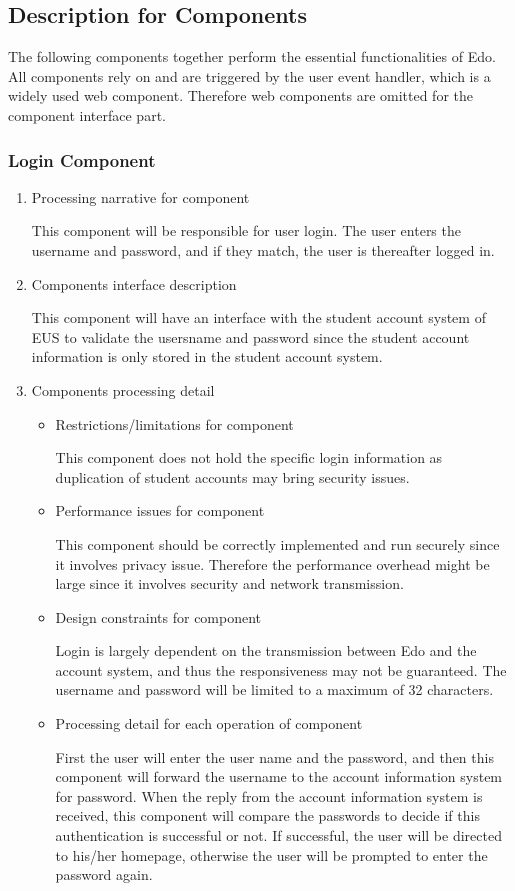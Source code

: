 \documentclass[paper=a4, fontsize=11pt]{scrartcl}
\numberwithin{equation}{section}		%
\numberwithin{figure}{section}			%
\numberwithin{table}{section}				%
\begin{document}
\subsection{Description for Components}

The following components together perform the essential functionalities of Edo. All components rely on and are triggered by the user event handler, which is a widely used web component. Therefore web components are omitted for the component interface part.

\subsubsection{Login Component}
\begin{enumerate}
	\item Processing narrative for component
	\par This component will be responsible for user login. The user enters the username and password, and if they match, the user is thereafter logged in.
	\item Components interface description
	\par This component will have an interface with the student account system of EUS to validate the usersname and password since the student account information is only stored in the student account system.
	\item Components processing detail
	\begin{itemize}
		\item Restrictions/limitations for component
		\par This component does not hold the specific login information as duplication of student accounts may bring security issues.
		\item Performance issues for component 
		\par This component should be correctly implemented and run securely since it involves privacy issue. Therefore the performance overhead might be large since it involves security and network transmission.
		\item Design constraints for component 
		\par Login is largely dependent on the transmission between Edo and the account system, and thus the responsiveness may not be guaranteed. The username and password will be limited to a maximum of 32 characters.
		\item Processing detail for each operation of component 
		\par First the user will enter the user name and the password, and then this component will forward the username to the account information system for password. When the reply from the account information system is received, this component will compare the passwords to decide if this authentication is successful or not. If successful, the user will be directed to his/her homepage, otherwise the user will be prompted to enter the password again.
	\end{itemize}
\end{enumerate}
\end{document}
